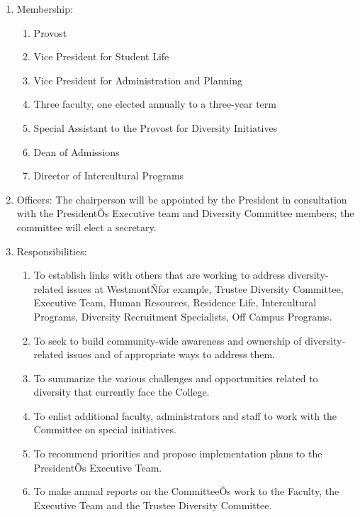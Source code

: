 \documentclass[letterpaper, 11pt]{article}
\begin{document}
					\begin{enumerate}[label=\alph*)]
						\item{Membership:
							\begin{enumerate}[label=\arabic*)]
								\item{Provost}
								\item{Vice President for Student Life}
								\item{Vice President for Administration and Planning}
								\item{Three faculty, one elected annually to a three-year term}
								\item{Special Assistant to the Provost for Diversity Initiatives}
								\item{Dean of Admissions}
								\item{Director of Intercultural Programs}
							\end{enumerate}
						}
						\item{Officers:
							The chairperson will be appointed by the President in consultation with the PresidentÕs Executive team and Diversity Committee members; the committee will elect a secretary.}
						\item{Responsibilities:
							\begin{enumerate}[label=\arabic*)]
								\item{To establish links with others that are working to address diversity-related issues at WestmontÑfor example, Trustee Diversity Committee, Executive Team, Human Resources, Residence Life, Intercultural Programs, Diversity Recruitment Specialists, Off Campus Programs.}
								\item{To seek to build community-wide awareness and ownership of diversity-related issues and of appropriate ways to address them.}
								\item{To summarize the various challenges and opportunities related to diversity that currently face the College.}
								\item{To enlist additional faculty, administrators and staff to work with the Committee on special initiatives.}
								\item{To recommend priorities and propose implementation plans to the PresidentÕs Executive Team.}
								\item{To make annual reports on the CommitteeÕs work to the Faculty, the Executive Team and the Trustee Diversity Committee.}
							\end{enumerate}
						}
					\end{enumerate}
\end{document}
